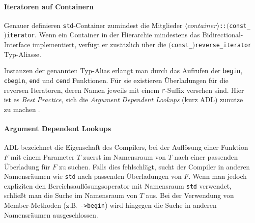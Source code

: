 \documentclass[runningheads]{llncs}
\begin{document}
\begin{figure}
	\vspace{-2em}
\end{figure}

\paragraph{Iteratoren auf Containern}
Genauer definieren \texttt{std}-Container zumindest die Mitglieder \texttt{$\langle{container}\rangle$::$($const\_$)$iterator}.
Wenn ein Container in der Hierarchie mindestens das Bidirectional-Interface implementiert, verfügt er zusätzlich über die \texttt{$($const\_$)$reverse\_iterator} Typ-Aliasse.

Instanzen der genannten Typ-Alias erlangt man durch das Aufrufen der \texttt{begin}, \texttt{cbegin}, \texttt{end} und \texttt{cend} Funktionen.
Für sie existieren Überladungen für die reversen Iteratoren, deren Namen jeweils mit einem \texttt{r}-Suffix versehen sind.
Hier ist es \textit{Best Practice}, sich die \textit{Argument Dependent Lookups} (kurz ADL) zunutze zu machen \cite[S.608]{profcpp}.

\paragraph{Argument Dependent Lookups}
ADL bezeichnet die Eigenschaft des Compilers, bei der Auflösung einer Funktion $F$ mit einem Parameter $T$ zuerst im Namensraum von $T$ nach einer passenden Überladung für $F$ zu suchen.
Falls dies fehlschlägt, sucht der Compiler in anderen Namensräumen wie \texttt{std} nach passenden Überladungen von $F$.
Wenn man jedoch expliziten den Bereichsauflösungsoperator mit Namensraum \texttt{std} verwendet, schließt man die Suche im Namensraum von $T$ aus.
Bei der Verwendung von Member-Methoden (z.B. \texttt{->begin}) wird hingegen die Suche in anderen Namensräumen ausgeschlossen.

\end{document}
